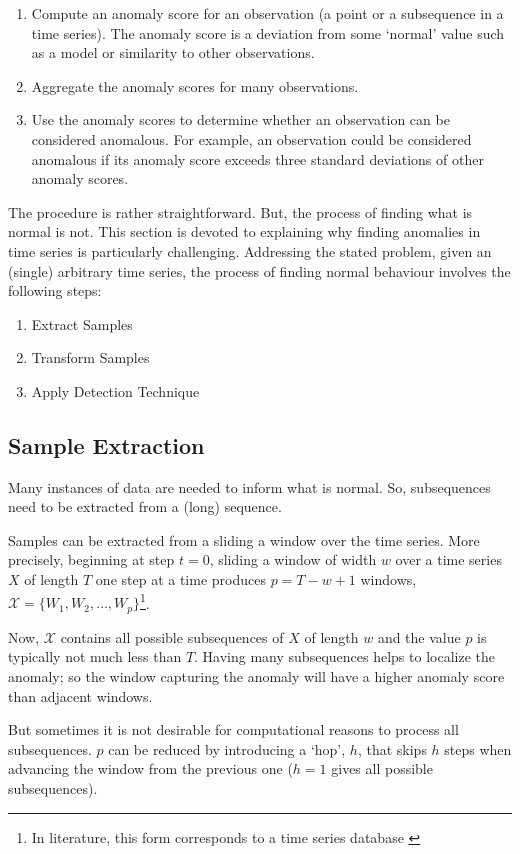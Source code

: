 \begin{enumerate}
\item Compute an anomaly score for an observation (a point or a subsequence in a time series). The anomaly score is a deviation from some `normal' value such as a model or similarity to other observations.
\item Aggregate the anomaly scores for many observations.
\item Use the anomaly scores to determine whether an observation can be considered anomalous. For example, an observation could be considered anomalous if its anomaly score exceeds three standard deviations of other anomaly scores.
\end{enumerate}

The procedure is rather straightforward. But, the process of finding what is normal is not. This section is devoted to explaining why finding anomalies in time series is particularly challenging. Addressing the stated problem, given an (single) arbitrary time series, the process of finding normal behaviour involves the following steps:
\begin{enumerate}
\item Extract Samples
\item Transform Samples
\item Apply Detection Technique
\end{enumerate}

\subsection{Sample Extraction}
\label{sec:adsample}

Many instances of data are needed to inform what is normal. So, subsequences need to be extracted from a (long) sequence.

Samples can be extracted from a sliding a window over the time series. More precisely, beginning at step $t=0$, sliding a window of width $w$ over a time series $X$ of length $T$ one step at a time produces $p=T-w+1$ windows, $\mathcal{X}=\{W_1,W_2,\ldots,W_p\}$\footnote{In literature, this form corresponds to a time series database \cite{Gupta2013}}.

Now, $\mathcal{X}$ contains all possible subsequences of $X$ of length $w$ and the value $p$ is typically not much less than $T$. Having many subsequences helps to localize the anomaly; so the window capturing the anomaly will have a higher anomaly score than adjacent windows.

But sometimes it is not desirable for computational reasons to process all subsequences. $p$ can be reduced by introducing a `hop', $h$, that skips $h$ steps when advancing the window from the previous one ($h=1$ gives all possible subsequences). 

